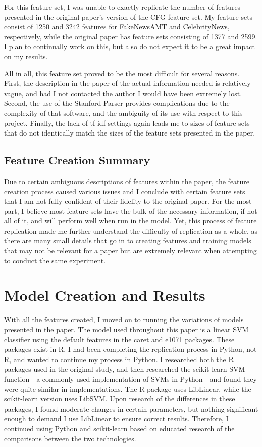 \documentclass{article}
\begin{document}
For this feature set, I was unable to exactly replicate the number of features presented in the original paper's version of the CFG feature set. My feature sets consist of 1250 and 3242 features for FakeNewsAMT and CelebrityNews, respectively, while the original paper has feature sets consisting of 1377 and 2599. I plan to continually work on this, but also do not expect it to be a great impact on my results.

All in all, this feature set proved to be the most difficult for several reasons. First, the description in the paper of the actual information needed is relatively vague, and had I not contacted the author I would have been extremely lost. Second, the use of the Stanford Parser provides complications due to the complexity of that software, and the ambiguity of its use with respect to this project. Finally, the lack of tf-idf settings again leads me to sizes of feature sets that do not identically match the sizes of the feature sets presented in the paper.

\subsection{Feature Creation Summary}

Due to certain ambiguous descriptions of features within the paper, the feature creation process caused various issues and I conclude with certain feature sets that I am not fully confident of their fidelity to the original paper. For the most part, I believe most feature sets have the bulk of the necessary information, if not all of it, and will perform well when run in the model. Yet, this process of feature replication made me further understand the difficulty of replication as a whole, as there are many small details that go in to creating features and training models that may not be relevant for a paper but are extremely relevant when attempting to conduct the same experiment.

\section{Model Creation and Results}

With all the features created, I moved on to running the variations of models presented in the paper. The model used throughout this paper is a linear SVM classifier using the default features in the caret and e1071 packages. These packages exist in R. I had been completing the replication process in Python, not R, and wanted to continue my process in Python. I researched both the R packages used in the original study, and then researched the scikit-learn SVM function - a commonly used implementation of SVMs in Python - and found they were quite similar in implementations. The R package uses LibLinear, while the scikit-learn version uses LibSVM. Upon research of the differences in these packages, I found moderate changes in certain parameters, but nothing significant enough to demand I use LibLinear to ensure correct results. Therefore, I continued using Python and scikit-learn based on educated research of the comparisons between the two technologies. 
\end{document}
